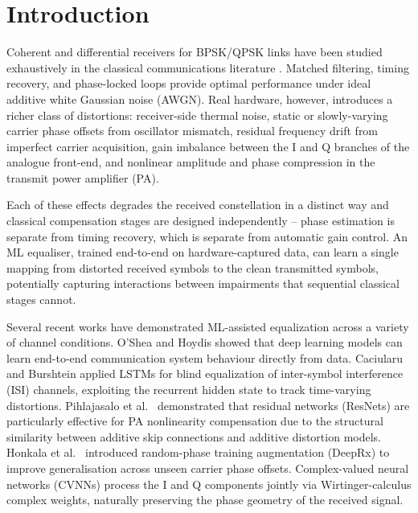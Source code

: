 \documentclass[journal]{IEEEtran}
\begin{document}
\section{Introduction}
\label{sec:intro}

Coherent and differential receivers for BPSK/QPSK links have been studied
exhaustively in the classical communications literature \cite{proakis2008digital}.
Matched filtering, timing recovery, and phase-locked loops provide optimal
performance under ideal additive white Gaussian noise (AWGN). Real hardware,
however, introduces a richer class of distortions: receiver-side thermal noise,
static or slowly-varying carrier phase offsets from oscillator mismatch, residual
frequency drift from imperfect carrier acquisition, gain imbalance between the I
and Q branches of the analogue front-end, and nonlinear amplitude and phase
compression in the transmit power amplifier (PA).

Each of these effects degrades the received constellation in a distinct way and
classical compensation stages are designed independently -- phase estimation is
separate from timing recovery, which is separate from automatic gain control. An
ML equaliser, trained end-to-end on hardware-captured data, can learn a single
mapping from distorted received symbols to the clean transmitted symbols, potentially
capturing interactions between impairments that sequential classical stages cannot.

Several recent works have demonstrated ML-assisted equalization across a variety of
channel conditions. O'Shea and Hoydis \cite{oshea2017introduction} showed that deep learning
models can learn end-to-end communication system behaviour directly from data.
Caciularu and Burshtein \cite{caciularu2020blind} applied LSTMs for blind equalization
of inter-symbol interference (ISI) channels, exploiting the recurrent hidden state
to track time-varying distortions. Pihlajasalo et al.\ \cite{pihlajasalo2023deep}
demonstrated that residual networks (ResNets) are particularly effective for PA
nonlinearity compensation due to the structural similarity between additive skip
connections and additive distortion models. Honkala et al.\ \cite{honkala2021deeprx}
introduced random-phase training augmentation (DeepRx) to improve generalisation
across unseen carrier phase offsets. Complex-valued neural networks (CVNNs)
\cite{trabelsi2018deep} process the I and Q components jointly via Wirtinger-calculus
complex weights, naturally preserving the phase geometry of the received signal.
\end{document}
